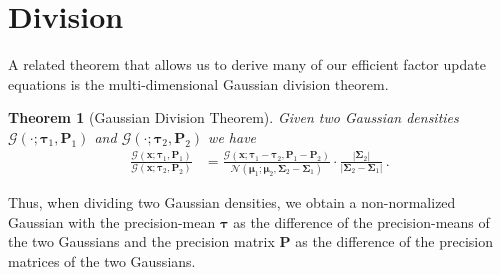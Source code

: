 \documentclass[a4paper]{article}
\newcommand{\Normal}[3]{{\mathcal N} \left({#1};{#2},{#3}\right)}
\newcommand{\Gauss}[3]{{\mathcal G} \left({#1};{#2},{#3}\right)}
\newcommand{\bs}[1]{{\boldsymbol{#1}}}
\newtheorem{theorem}{Theorem}
\theoremstyle{definition}
\begin{document}
\section*{Division}
A related theorem that allows us to derive many of our efficient factor update equations is the multi-dimensional Gaussian division theorem.
\begin{theorem}[Gaussian Division Theorem] \label{thm:gaussian_division}
    Given two Gaussian densities $\Gauss{\cdot}{\bs{\tau}_1}{\bs{P}_1}$ and $\Gauss{\cdot}{\bs{\tau}_2}{\bs{P}_2}$ we have
    \begin{align*}
        \frac{\Gauss{\bs{x}}{\bs{\tau}_1}{\bs{P}_1}}{\Gauss{\bs{x}}{\bs{\tau}_2}{\bs{P}_2}} & = \frac{\Gauss{\bs{x}}{\bs{\tau}_1 - \bs{\tau}_2}{\bs{P}_1 - \bs{P}_2}}{\Normal{\bs{\mu}_1}{\bs{\mu}_2}{\bs{\Sigma}_2 - \bs{\Sigma}_1}} \cdot \frac{\left| \bs{\Sigma}_2 \right|}{\left| \bs{\Sigma}_2 - \bs{\Sigma}_1 \right|} \,.
    \end{align*}
\end{theorem}
Thus, when dividing two Gaussian densities, we obtain a non-normalized Gaussian with the precision-mean $\bs{\tau}$ as the difference of the precision-means of the two Gaussians and the precision matrix $\bs{P}$ as the difference of the precision matrices of the two Gaussians. 
\end{document}
